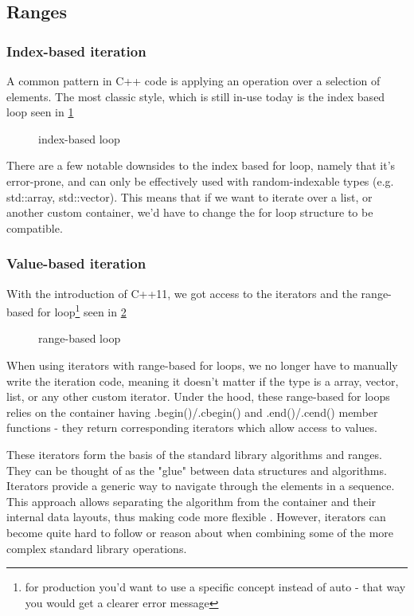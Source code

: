 \documentclass[
    english, %
]{VUMIFPSkursinis}
\begin{document}
\FloatBarrier
\subsection{Ranges}

\newcommand{\addfile}[3] {
    \begin{figure}[!htbp]
        \centering
        #1
    \caption{#2}
    \label{fig:#3}
    \end{figure}
}

\FloatBarrier
\subsubsection{Index-based iteration}

A common pattern in C++ code is applying an operation over a selection of elements. The most classic style, which is still in-use today is the index based loop seen in \cref{fig:index_loop}

\addfile{}{index-based loop}{index_loop}

There are a few notable downsides to the index based for loop, namely that it's error-prone, and can only be effectively used with random-indexable types (e.g. std::array, std::vector).
This means that if we want to iterate over a list, or another custom container, we'd have to change the for loop structure to be compatible.

\FloatBarrier
\subsubsection{Value-based iteration}

With the introduction of C++11, we got access to the iterators and the range-based for loop\footnote{for production you'd want to use a specific concept instead of auto - that way you would get a clearer error message} seen in \cref{fig:range_loop}

\addfile{}{range-based loop}{range_loop}

When using iterators with range-based for loops, we no longer have to manually write the iteration code, meaning it doesn't matter if the type is a array, vector, list, or any other custom iterator.
Under the hood, these range-based for loops relies on the container having .begin()/.cbegin() and .end()/.cend() member functions - they return corresponding iterators which allow access to values.

These iterators form the basis of the standard library algorithms and ranges. They can be thought of as the "glue" between data structures and algorithms. Iterators provide a generic way to navigate through the elements in a sequence. This approach allows separating the algorithm from the container and their internal data layouts, thus making code more flexible \cite{HPCPP}. However, iterators can become quite hard to follow or reason about when combining some of the more complex standard library operations.
\end{document}
